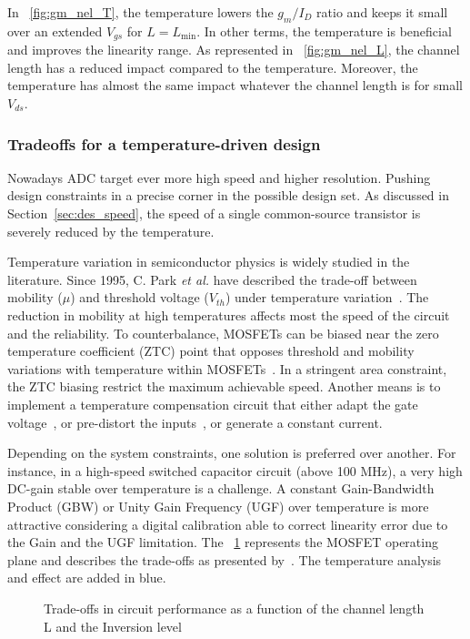 In \figurename~\ref{fig:gm_nel_T}, the temperature lowers the \(g_m/I_D\) ratio and keeps it small over an extended \(V_{gs}\) for \(L = L_{\min}\). In other terms, the temperature is beneficial and improves the linearity range. As represented in \figurename~\ref{fig:gm_nel_L}, the channel length has a reduced impact compared to the temperature. Moreover, the temperature has almost the same impact whatever the channel length is for small \(V_{ds}\).

\subsubsection{Tradeoffs for a temperature-driven design}
Nowadays ADC target ever more high speed and higher resolution. Pushing design constraints in a precise corner in the possible design set. As discussed in Section~\ref{sec:des_speed}, the speed of a single common-source transistor is severely reduced by the temperature.

Temperature variation in semiconductor physics is widely studied in the literature. Since 1995, C. Park \textit{et al.} have described the trade-off between mobility (\(\mu \)) and threshold voltage (\(V_{th} \)) under temperature variation~\cite{Park1995}. The reduction in mobility at high temperatures affects most the speed of the circuit and the reliability. To counterbalance, MOSFETs can be biased near the zero temperature coefficient (ZTC) point that opposes threshold and mobility variations with temperature within MOSFETs~\cite{Shoucair1986,Filanovsky2001}. In a stringent area constraint, the ZTC biasing restrict the maximum achievable speed. Another means is to implement a temperature compensation circuit that either adapt the gate voltage~\cite{Chen2011, Gomez2010}, or pre-distort the inputs~\cite{Sira2013}, or generate a constant current.

Depending on the system constraints, one solution is preferred over another. For instance, in a high-speed switched capacitor circuit (above 100 MHz), a very high DC-gain stable over temperature is a challenge. A constant Gain-Bandwidth Product (GBW) or Unity Gain Frequency (UGF) over temperature is more attractive considering a digital calibration able to correct linearity error due to the Gain and the UGF limitation. The \figurename~\ref{fig:tradeoffs} represents the MOSFET operating plane and describes the trade-offs as presented by~\cite{Binkley2003}. The temperature analysis and effect are added in blue.
\begin{figure}[!ht]
	\centering
	
	\caption{Trade-offs in circuit performance as a function of the channel length L and the Inversion level}
	\label{fig:tradeoffs}
\end{figure}

